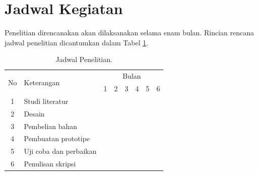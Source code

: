 \section{Jadwal Kegiatan}
	Penelitian direncanakan akan dilaksanakan selama enam bulan. Rincian rencana jadwal penelitian dicantumkan dalam Tabel \ref{jadwal}.

		\begin{table}[ht!]
		\centering
		\caption{Jadwal Penelitian.}
		\label{jadwal}
		\begin{tabular}{|c|l|l|l|l|l|l|l|}
		\hline
		\multirow{2}{*}{No} & \multirow{2}{*}{Keterangan} & \multicolumn{6}{c|}{Bulan}                                                                                                                          \\ \cline{3-8} 
		                    &                             & 1 & 2 & 3 & 4 & 5 & 6 \\ \hline
		1                   & Studi literatur                                  &\cellcolor{gray} &\cellcolor{gray}&                        &                        &                        &                         \\ \hline
		2                   & Desain                                           &                        &\cellcolor{gray}&\cellcolor{gray}&                        &                        &                         \\ \hline
		3                   & Pembelian bahan                                  &                        &                        &\cellcolor{gray}&                        &                        &                         \\ \hline
		4                   & Pembuatan prototipe                              &                        &                        &\cellcolor{gray}&\cellcolor{gray}&\cellcolor{gray}&                         \\ \hline
		5                   & Uji coba dan perbaikan                           &                        &                        &                        &\cellcolor{gray}&\cellcolor{gray}&                         \\ \hline
		6                   & Penulisan skripsi                                &                        &                        &                        &                        &                        &\cellcolor{gray}\\ \hline
		\end{tabular}
		\end{table}
	
